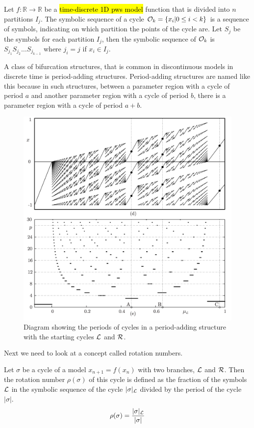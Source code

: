 \begin{definition}
	Let $f: \mathbb{R} \to \mathbb{R}$ be a \hl{time-discrete 1D \gls{pws} model} function that is divided into $n$ partitions $I_j$.
	The symbolic sequence of a cycle $\mathcal{O}_k = \{x_i | 0 \leq i < k\}$ is a sequence of symbols, indicating on which partition the points of the cycle are.
	Let $S_j$ be the symbols for each partition $I_j$, then the symbolic sequence of $\mathcal{O}_k$ is $S_{j_1} S_{j_2} \dots S_{j_{k-1}}$ where $j_i = j$ if $x_i \in I_j$.
\end{definition}

A class of bifurcation structures, that is common in discontinuous models in discrete time is period-adding structures.
Period-adding structures are named like this because in such structures, between a parameter region with a cycle of period $a$ and another parameter region with a cycle of period $b$, there is a parameter region with a cycle of period $a + b$.

\begin{figure}
	\centering
	\includegraphics[width=.5 \textwidth]{../StatusMeeting/02/Figs/PeriodAddingDiagrams_Slides.png}
	\caption[Diagram of periods in a period-adding structure between $\L$ and $\R$]{
		Diagram showing the periods of cycles in a period-adding structure with the starting cycles $\L$ and $\R$.
	}
\end{figure}

Next we need to look at a concept called rotation numbers.

\begin{definition}
	Let $\sigma$ be a cycle of a model $x_{n+1} = f(x_n)$ with two branches, $\L$ and $\R$.
	Then the rotation number $\rho(\sigma)$ of this cycle is defined as the fraction of the symbols $\L$ in the symbolic sequence of the cycle $|\sigma|_{\mathcal{L}}$ divided by the period of the cycle $|\sigma|$.
	\begin{align}
		\rho(\sigma) = \dfrac{|\sigma|_{\mathcal{L}}}{|\sigma|}
	\end{align}
	\vspace{-4.5em}
	\begin{flushright}
		\cite{Keener80}
	\end{flushright}
\end{definition}

